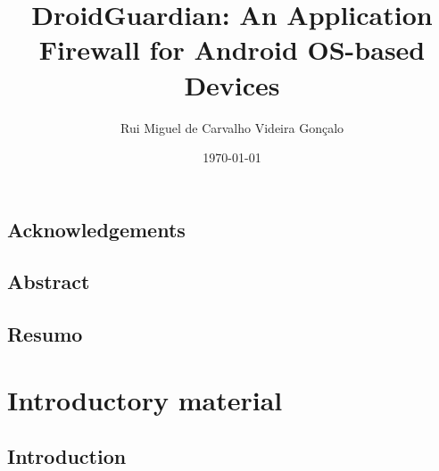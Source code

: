 \documentclass[
  oneside,
  11pt, a4paper,
  footinclude=true,
  headinclude=true,
  cleardoublepage=empty
]{scrbook}
\title{DroidGuardian: An Application Firewall for Android OS-based Devices}
\author{Rui Miguel de Carvalho Videira Gonçalo}
\date{\today}
\begin{document}
\sloppy


\sf
	\pagestyle{empty}
	
\rm
	\cleardoublepage

\chapter*{Acknowledgements}

	\cleardoublepage
	
\chapter*{Abstract}

	\cleardoublepage

\chapter*{Resumo}

	\cleardoublepage
	
	\setcounter{page}{3}
	\rm
	
	\cleardoublepage
	\tableofcontents
	
	\cleardoublepage
	\listoffigures
	
	\cleardoublepage
	\listoftables
	
	\cleardoublepage
	\lstlistoflistings
	
	
	
	\cleardoublepage
	\setcounter{page}{3}

\part{Introductory material}

\chapter{Introduction}
\label{chap:introduction}

\end{document}
